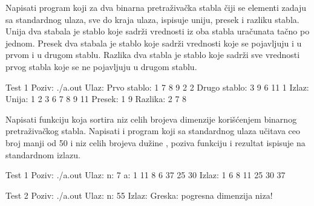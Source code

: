 \begin{Answer}[ref=707]
\end{Answer}


\begin{Exercise}[label=708, difficulty=1]
Napisati program koji za dva binarna pretraživačka stabla čiji se elementi zadaju sa standardnog ulaza, sve do kraja ulaza, ispisuje uniju, presek i razliku stabla. Unija dva stabala je stablo koje sadrži vrednosti iz oba stabla uračunata tačno po jednom. Presek dva stabala je stablo koje sadrži vrednosti koje se pojavljuju i u prvom i u drugom stablu. Razlika dva stabla je stablo koje sadrži sve vrednosti prvog stabla koje se ne pojavljuju u drugom stablu. 

\begin{miditest}
\begin{test}{Test 1}
Poziv: ./a.out
Ulaz:
	Prvo stablo: 1 7 8 9 2 2
	Drugo stablo: 3 9 6 11 1
Izlaz:
	Unija: 1 2 3 6 7 8 9 11
	Presek: 1 9 
	Razlika: 2 7 8 
\end{test}
\end{miditest}

\end{Exercise}

\begin{Answer}[ref=708]
\end{Answer}


\begin{Exercise}[label=709]
Napisati funkciju  koja sortira niz celih brojeva  dimenzije  korišćenjem binarnog pretraživačkog stabla. Napisati i program koji sa standardnog ulaza učitava ceo broj  manji od 50 i niz  celih brojeva dužine , poziva funkciju  i rezultat ispisuje na standardnom izlazu.  

\begin{miditest}
\begin{test}{Test 1}
Poziv: ./a.out
Ulaz:
	n: 7 
	a: 1 11 8 6 37 25 30
Izlaz:
	1 6 8 11 25 30 37 
\end{test}
\end{miditest}

\begin{maxitest}
\begin{test}{Test 2}
Poziv: ./a.out
Ulaz:
	n: 55 
Izlaz:
	Greska: pogresna dimenzija niza!
\end{test}
\end{maxitest}
\end{Exercise}

